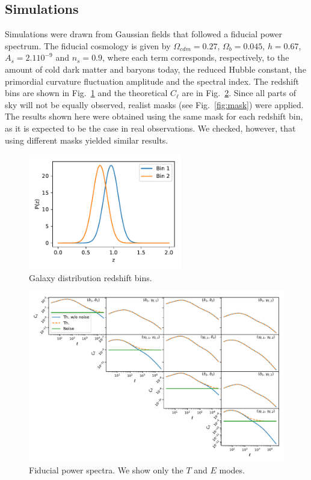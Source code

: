 \documentclass[a4paper,11pt]{article}
\newcommand{\cl}{C_\ell}
\begin{document}
\subsection{Simulations}

Simulations were drawn from Gaussian fields that followed a fiducial power
spectrum. The fiducial cosmology is given by $\Omega_{cdm} = 0.27$, $\Omega_b
= 0.045$, $h = 0.67$, $A_s = 2.1 10^{-9}$ and $n_s = 0.9$, where each term
corresponds, respectively, to the amount of cold dark matter and baryons today,
the reduced Hubble constant, the primordial curvature fluctuation amplitude
and the spectral index. The redshift bins are shown in Fig.~\ref{fig:pz} and
the theoretical $\cl$ are in Fig.~\ref{fig:cl-2bins}. Since all parts of sky
will not be equally observed, realist masks (see Fig.~\ref{fig:mask}) were
applied.  The results shown here were obtained using the same mask for each
redshift bin, as it is expected to be the case in real observations. We
checked, however, that using different masks yielded similar results. 

\begin{figure}
  \centering
  \includegraphics[width=0.6\textwidth]{./figures/pz.pdf}
  \caption{Galaxy distribution redshift bins.}
  \label{fig:pz}
\end{figure}

\begin{figure}
  \centering
  \includegraphics[width=\textwidth]{./figures/cls-sph-2b.pdf}
  \caption{Fiducial power spectra. We show only the $T$ and $E$ modes.}
  \label{fig:cl-2bins}
\end{figure}
\end{document}
